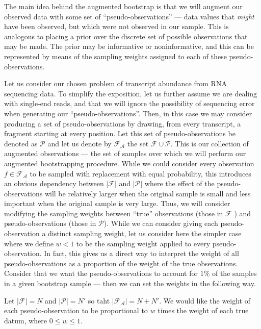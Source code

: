 The main idea behind the augmented bootstrap is that we will augment our observed data with some set 
of ``pseudo-observations'' --- data values that \textit{might} have been observed, but which were not observed 
in our sample.  This is analogous to placing a prior over the discrete set of possible observations 
that may be made. The prior may be informative or noninformative, and this can be represented by means 
of the sampling weights assigned to each of these pseudo-observations.

Let us consider our chosen problem of transcript abundance from RNA sequencing data. To simplify the 
exposition, let us further assume we are dealing with single-end reads, and that we will ignore the 
possibility of sequencing error when generating our ``pseudo-observations''. Then, in this case we 
may consider producing a set of pseudo-observations by drawing, from every transcript, a fragment 
starting at every position.  Let this set of pseudo-observations be denoted as $\mathcal{P}$ and 
let us denote by $\mathcal{F_{A}}$ the set $\mathcal{F} \cup \mathcal{P}$. This is our collection 
of augmented observations — the set of samples over which we will perform our augmented 
bootstrapping procedure.  While we could consider every observation $f \in \mathcal{F_{A}}$ to be 
sampled with replacement with equal probability, this introduces an obvious dependency between 
$\left|\mathcal{F}\right|$ and $\left|\mathcal{P}\right|$ where the effect of the 
pseudo-observations will be relatively larger when the original sample is small and less important 
when the original sample is very large.  Thus, we will consider modifying the sampling weights 
between ``true'' observations (those in $\mathcal{F}$ ) and pseudo-observations 
(those in $\mathcal{P}$).  While we can consider giving each pseudo-observation a distinct sampling 
weight, let us consider here the simpler case where we define $w < 1$ to be the sampling weight 
applied to every pseudo-observation.  In fact, this gives us a direct way to interpret the weight 
of all pseudo-observations as a proportion of the weight of the true observations.  Consider that 
we want the pseudo-observations to account for $1\%$ of the samples in a given bootstrap sample — 
then we can set the weights in the following way.

Let $\left|\mathcal{F}\right| = N$ and $\left| \mathcal{P} \right| = N'$ so taht 
$\left| \mathcal{F_{A}} \right| = N + N'$.  We would like the weight of each pseudo-observation 
to be proportional to $w$ times the weight of each true datum, where $0 \le w \le 1$. 

